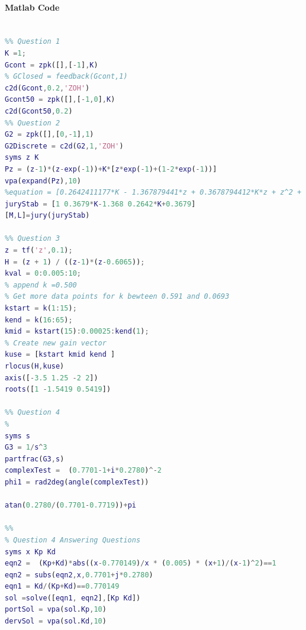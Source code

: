 \paragraph{Matlab Code}
\begin{lstlisting}[language = Matlab,frame=single,caption={}]
%% ELEC 460 Assignment 4

%% Question 1
K =1;
Gcont = zpk([],[-1],K)
% GClosed = feedback(Gcont,1)
c2d(Gcont,0.2,'ZOH')
Gcont50 = zpk([],[-1,0],K)
c2d(Gcont50,0.2)
%% Question 2 
G2 = zpk([],[0,-1],1)
G2Discrete = c2d(G2,1,'ZOH')
syms z K
Pz = (z-1)*(z-exp(-1))+K*[z*exp(-1)+(1-2*exp(-1))]
vpa(expand(Pz),10)
%equation = [0.2642411177*K - 1.367879441*z + 0.3678794412*K*z + z^2 + 0.3678794412]
juryStab = [1 0.3679*K-1.368 0.2642*K+0.3679]
[M,L]=jury(juryStab)

%% Question 3
z = tf('z',0.1);
H = (z + 1) / ((z-1)*(z-0.6065));
kval = 0:0.005:10;
% append k =0.500
% Get more data points for k bewteen 0.591 and 0.0693
kstart = k(1:15);
kend = k(16:65);
kmid = kstart(15):0.00025:kend(1); 
% Create new gain vector
kuse = [kstart kmid kend ]
rlocus(H,kuse)
axis([-3.5 1.25 -2 2])
roots([1 -1.5419 0.5419])

%% Question 4
%
syms s 
G3 = 1/s^3
partfrac(G3,s)
complexTest =  (0.7701-1+i*0.2780)^-2
phi1 = rad2deg(angle(complexTest))

atan(0.2780/(0.7701-0.7719))+pi

%% 
% Question 4 Answering Questions
syms x Kp Kd
eqn2 =  (Kp+Kd)*abs((x-0.770149)/x * (0.005) * (x+1)/(x-1)^2)==1
eqn2 = subs(eqn2,x,0.7701+j*0.2780)
eqn1 = Kd/(Kp+Kd)==0.770149
sol =solve([eqn1, eqn2],[Kp Kd])
portSol = vpa(sol.Kp,10)
dervSol = vpa(sol.Kd,10)
\end{lstlisting}
